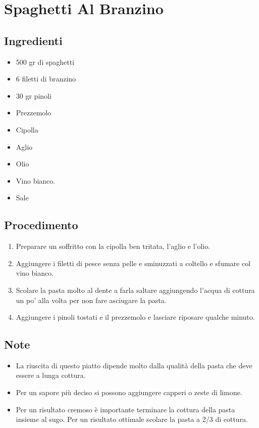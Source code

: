 \section{Spaghetti Al Branzino}
\subsection{Ingredienti}
\begin{itemize}
\item 500 gr di spaghetti  
\item 6 filetti di branzino  
\item 30 gr pinoli  
\item Prezzemolo  
\item Cipolla  
\item Aglio  
\item Olio  
\item Vino bianco.  
\item Sale
\end{itemize}
\subsection{Procedimento}
\begin{enumerate}
\item  Preparare un soffritto con la cipolla ben tritata, l'aglio e l'olio.  
\item  Aggiungere i filetti di pesce senza pelle e sminuzzati a coltello e sfumare col vino bianco.   
\item  Scolare la pasta molto al dente a farla saltare aggiungendo l'acqua di cottura un po' alla volta per non fare asciugare la pasta.  
\item  Aggiungere i pinoli tostati e il prezzemolo e lasciare riposare qualche minuto.
\end{enumerate}
\subsection{Note}
\begin{itemize}
\item La riuscita di questo piatto dipende molto dalla qualità della pasta che deve essere a lunga cottura.  
\item Per un sapore più deciso si possono aggiungere capperi o zeste di limone.  
\item Per un risultato cremoso è importante terminare la cottura della pasta insieme al sugo. Per un risultato ottimale scolare la pasta a 2/3 di cottura.
\end{itemize}
